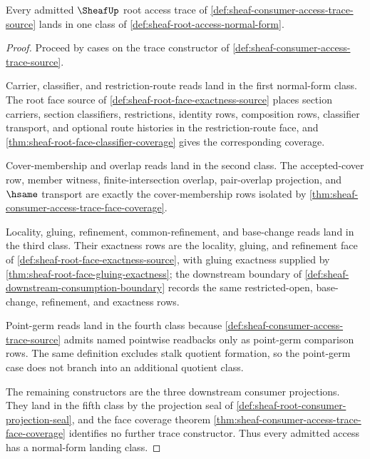 \begin{theorem}
\label{thm:sheaf-root-access-normal-form-coverage}
Every admitted $\SheafUp$ root access trace of \autoref{def:sheaf-consumer-access-trace-source} lands in one class of \autoref{def:sheaf-root-access-normal-form}.
\end{theorem}
\begin{proof}
Proceed by cases on the trace constructor of \autoref{def:sheaf-consumer-access-trace-source}.

Carrier, classifier, and restriction-route reads land in the first normal-form class. The root face source of \autoref{def:sheaf-root-face-exactness-source} places section carriers, section classifiers, restrictions, identity rows, composition rows, classifier transport, and optional route histories in the restriction-route face, and \autoref{thm:sheaf-root-face-classifier-coverage} gives the corresponding coverage.

Cover-membership and overlap reads land in the second class. The accepted-cover row, member witness, finite-intersection overlap, pair-overlap projection, and $\hsame$ transport are exactly the cover-membership rows isolated by \autoref{thm:sheaf-consumer-access-trace-face-coverage}.

Locality, gluing, refinement, common-refinement, and base-change reads land in the third class. Their exactness rows are the locality, gluing, and refinement face of \autoref{def:sheaf-root-face-exactness-source}, with gluing exactness supplied by \autoref{thm:sheaf-root-face-gluing-exactness}; the downstream boundary of \autoref{def:sheaf-downstream-consumption-boundary} records the same restricted-open, base-change, refinement, and exactness rows.

Point-germ reads land in the fourth class because \autoref{def:sheaf-consumer-access-trace-source} admits named pointwise readbacks only as point-germ comparison rows. The same definition excludes stalk quotient formation, so the point-germ case does not branch into an additional quotient class.

The remaining constructors are the three downstream consumer projections. They land in the fifth class by the projection seal of \autoref{def:sheaf-root-consumer-projection-seal}, and the face coverage theorem \autoref{thm:sheaf-consumer-access-trace-face-coverage} identifies no further trace constructor. Thus every admitted access has a normal-form landing class.
\end{proof}

